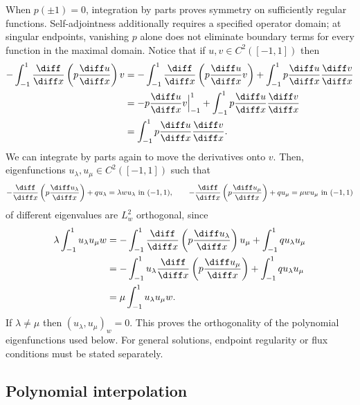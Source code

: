 \begin{remark}[Sturm--Liouville problems with $p(\pm 1) = 0$]
    \label{rem:Sturm-Liouville degenerate}
    When $p(\pm1)=0$, integration by parts proves symmetry on sufficiently regular functions. Self-adjointness additionally requires a specified operator domain; at singular endpoints, vanishing $p$ alone does not eliminate boundary terms for every function in the maximal domain. Notice that if $u,v \in C^2([-1,1])$ then
    \begin{align*}
        -\int_{-1}^1\frac{\diff}{\diff x}\left(p\frac{\diff u}{\diff x}\right)v
         & = -\int_{-1}^1\frac{\diff}{\diff x}\left(p\frac{\diff u}{\diff x}v \right) + \int_{-1}^1p\frac{\diff u}{\diff x} \frac{\diff v}{\diff x}
        \\
         & = - p \frac{\diff u}{\diff x} v\Big|_{-1}^1 + \int_{-1}^1 p\frac{\diff u}{\diff x}  \frac{\diff v}{\diff x}
        \\
         & =  \int_{-1}^1 p\frac{\diff u}{\diff x}\frac{\diff v}{\diff x}.
    \end{align*}
    We can integrate by parts again to move the derivatives onto $v$.
    Then, eigenfunctions $u_\lambda, u_\mu \in C^2([-1,1])$ such that
    \begin{equation*}
        -\frac{\diff}{\diff x}\left(p\frac{\diff u_\lambda}{\diff x}\right) + q u_\lambda = \lambda w u_\lambda \text{ in } (-1,1), \qquad -\frac{\diff}{\diff x}\left(p\frac{\diff u_\mu}{\diff x}\right) + q u_\mu = \mu w u_\mu  \text{ in } (-1,1)
    \end{equation*}
    of different eigenvalues are $L^2_w$ orthogonal, since
    \begin{align*}
        \lambda \int_{-1}^1 u_\lambda u_\mu w
         & = -\int_{-1}^1 \frac{\diff}{\diff x} \left( p \frac{\diff u_\lambda}{\diff x} \right) u_\mu + \int_{-1}^1 q u_\lambda u_\mu
        \\
         & = -\int_{-1}^1 u_\lambda \frac{\diff}{\diff x} \left( p \frac{\diff u_\mu}{\diff x} \right) + \int_{-1}^1 q u_\lambda u_\mu     \\
         & = \mu \int_{-1}^1 u_\lambda u_\mu w.
    \end{align*}
    If $\lambda \ne \mu$ then $(u_\lambda, u_\mu)_w = 0$. This proves the orthogonality of the polynomial eigenfunctions used below. For general solutions, endpoint regularity or flux conditions must be stated separately.
\end{remark}

\subsection{Polynomial interpolation}

